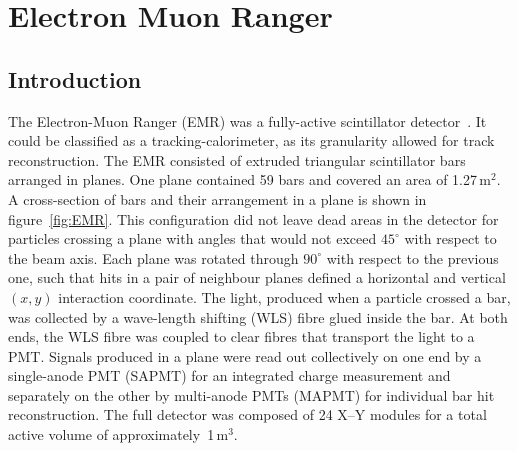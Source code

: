 \graphicspath{{05-EMR/Figures/}}

\section{Electron Muon Ranger}
\label{Sect:EMR}

\subsection{Introduction}
\label{SubSect:EMR_Intro}

The Electron-Muon Ranger (EMR) was a fully-active scintillator detector~\cite{2016JInst..11T10007}. It could be classified as a tracking-calorimeter, as its granularity allowed for track reconstruction. The EMR consisted of extruded triangular scintillator bars arranged in planes. One plane contained 59 bars and covered an area of 1.27\,m$^2$.
A cross-section of bars and their arrangement in a plane is shown in figure~\ref{fig:EMR}. This configuration did not leave dead areas in the detector for particles crossing a plane with angles that would not exceed $45^{\circ}$ with respect to the beam axis. Each plane was rotated through $90^{\circ}$ with respect to the previous one, such that hits in a pair of neighbour planes defined a horizontal and vertical $(x, y)$ interaction coordinate. The light, produced when a particle crossed a bar, was collected by a wave-length shifting (WLS) fibre glued inside the bar. At both ends, the WLS fibre was coupled to clear fibres that transport the light to a PMT. Signals produced in a plane were read out collectively on one end by a single-anode PMT (SAPMT) for an integrated charge measurement and separately on the other by multi-anode PMTs (MAPMT) for individual bar hit reconstruction. The full detector was composed of 24 X--Y modules for a total active volume of approximately~1\,m$^3$.

